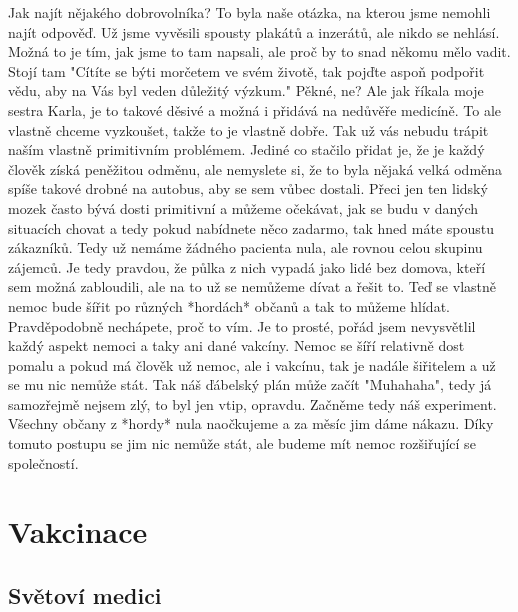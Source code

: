 Jak najít nějakého dobrovolníka? To byla naše otázka, na kterou jsme nemohli najít odpověď. Už jsme vyvěsili spousty plakátů a inzerátů, ale nikdo se nehlásí. Možná to je tím, jak jsme to tam napsali, ale proč by to snad někomu mělo vadit. Stojí tam "Cítíte se býti morčetem ve svém životě, tak pojďte aspoň podpořit vědu, aby na Vás byl veden důležitý výzkum." Pěkné, ne? Ale jak říkala moje sestra Karla, je to takové děsivé a možná i přidává na nedůvěře medicíně. To ale vlastně chceme vyzkoušet, takže to je vlastně dobře. Tak už vás nebudu trápit naším vlastně primitivním problémem. Jediné co stačilo přidat je, že je každý člověk získá peněžitou odměnu, ale nemyslete si, že to byla nějaká velká odměna spíše takové drobné na autobus, aby se sem vůbec dostali. Přeci jen ten lidský mozek často bývá dosti primitivní a můžeme očekávat, jak se budu v daných situacích chovat a tedy pokud nabídnete něco zadarmo, tak hned máte spoustu zákazníků. Tedy už nemáme žádného pacienta nula, ale rovnou celou skupinu zájemců. Je tedy pravdou, že půlka z nich vypadá jako lidé bez domova, kteří sem možná zabloudili, ale na to už se nemůžeme dívat a řešit to. Teď se vlastně nemoc bude šířit po různých *hordách* občanů a tak to můžeme hlídat. Pravděpodobně nechápete, proč to vím. Je to prosté, pořád jsem nevysvětlil každý aspekt nemoci a taky ani dané vakcíny. Nemoc se šíří relativně dost pomalu a pokud má člověk už nemoc, ale i vakcínu, tak je nadále šiřitelem a už se mu nic nemůže stát. Tak náš ďábelský plán může začít "Muhahaha", tedy já samozřejmě nejsem zlý, to byl jen vtip, opravdu. Začněme tedy náš experiment. Všechny občany z *hordy* nula naočkujeme a za měsíc jim dáme nákazu. Díky tomuto postupu se jim nic nemůže stát, ale budeme mít nemoc rozšiřující se společností.

\chapter{Vakcinace}

\section{Světoví medici}

